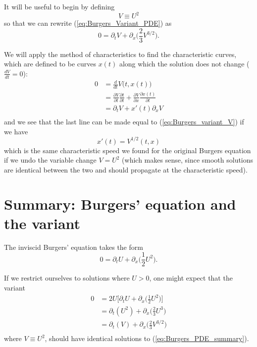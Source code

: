 \documentclass[12pt]{article}
\numberwithin{equation}{section}
\begin{document}
It will be useful to begin by defining
\begin{equation}
V \equiv U^2
\end{equation}
so that we can rewrite (\ref{eq:Burgers_Variant_PDE}) as
\begin{equation} \label{eq:Burgers_variant_V}
0 = \partial_t V + \partial_x \Big( \frac{2}{3} V^{3/2} \Big).
\end{equation}

We will apply the method of characteristics to find the characteristic curves,
which are defined to be curves $x(t)$ along which the solution does not change
($\frac{d V}{d t} = 0$):
\begin{equation}
\begin{aligned}
0 &= \frac{d}{d t} V \big( t, x(t) \big)\\
&= \frac{\partial V}{\partial t} \frac{\partial t}{\partial t}
    + \frac{\partial V}{\partial x} \frac{\partial x(t)}{\partial t} \\
&= \partial_t V + x'(t) \partial_x V \\
\end{aligned}
\end{equation}
and we see that the last line can be made equal to
(\ref{eq:Burgers_variant_V}) if we have
\begin{equation}
x'(t) = V^{1/2}(t, x)
\end{equation}
which is the same characteristic speed we found for the original Burgers
equation if we undo the variable change $V = U^2$ (which makes sense,
since smooth solutions are identical between the two and should propagate
at the characteristic speed).

\clearpage

\section{Summary: Burgers' equation and the variant}

The inviscid Burgers' equation takes the form
\begin{equation} \label{eq:Burgers_PDE_summary}
0 = \partial_t U + \partial_x \Big( \frac{1}{2} U^2 \Big).
\end{equation}

If we restrict ourselves to solutions where $U > 0$, one might expect that the
variant
\begin{equation} \label{eq:Burgers_Variant_PDE_summary}
\begin{aligned}
0 &= 2 U \Big[ \partial_t U + \partial_x \Big( \frac{1}{2} U^2 \Big) \Big] \\
&= \partial_t (U^2) + \partial_x \Big( \frac{2}{3} U^3 \Big) \\
&= \partial_t (V) + \partial_x \Big( \frac{2}{3} V^{3/2} \Big) \\
\end{aligned}
\end{equation}
where $V \equiv U^2$, should have identical solutions to
(\ref{eq:Burgers_PDE_summary}).
\end{document}
